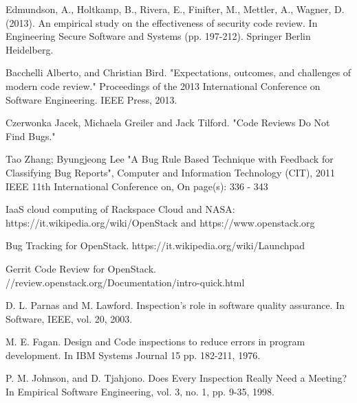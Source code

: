 %
%

%
% 
% 
%
\begin{thebibliography}{99.}
%
%
%
 Edmundson, A., Holtkamp, B., Rivera, E., Finifter, M., Mettler, A., Wagner, D. (2013). 
An empirical study on the effectiveness of security code review. In Engineering Secure Software and Systems 
(pp. 197-212). Springer Berlin Heidelberg.

 Bacchelli Alberto, and Christian Bird. 
"Expectations, outcomes, and challenges of modern code review." 
Proceedings of the 2013 International Conference on Software Engineering. IEEE Press, 2013.

 Czerwonka Jacek, Michaela Greiler and Jack Tilford. "Code Reviews Do Not Find Bugs."

 Tao Zhang; Byungjeong Lee "A Bug Rule Based Technique with Feedback for Classifying Bug Reports",  
Computer and Information Technology (CIT), 2011 IEEE 11th International Conference on, On page(s): 336 - 343 

 IaaS cloud computing of Rackspace Cloud and NASA: https://it.wikipedia.org/wiki/OpenStack and 
https://www.openstack.org

 Bug Tracking for OpenStack. https://it.wikipedia.org/wiki/Launchpad

 Gerrit Code Review for OpenStack. //review.openstack.org/Documentation/intro-quick.html

 D. L. Parnas and M. Lawford. Inspection's role in software quality assurance. In 
Software, IEEE,  vol. 20, 2003. 

 M. E. Fagan. Design and Code inspections to reduce errors in program development. In IBM Systems Journal 15 
pp. 182-211, 1976. 

 P. M. Johnson, and D. Tjahjono. Does Every Inspection Really Need a Meeting? In Empirical Software Engineering, vol. 3, 
no. 1, pp. 9-35, 1998. 


\end{thebibliography}
